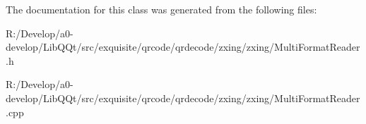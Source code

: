 The documentation for this class was generated from the following files\+:\begin{DoxyCompactItemize}
\item 
R\+:/\+Develop/a0-\/develop/\+Lib\+Q\+Qt/src/exquisite/qrcode/qrdecode/zxing/zxing/Multi\+Format\+Reader.\+h\item 
R\+:/\+Develop/a0-\/develop/\+Lib\+Q\+Qt/src/exquisite/qrcode/qrdecode/zxing/zxing/Multi\+Format\+Reader.\+cpp\end{DoxyCompactItemize}
